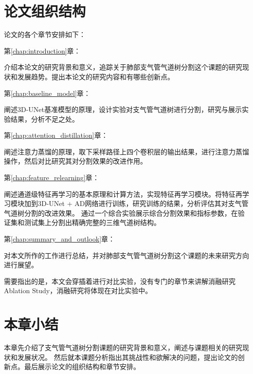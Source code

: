 \section{论文组织结构}

论文的各个章节安排如下：

{\kaishu 第\ref{chap:introduction}章：}

介绍本论文的研究背景和意义，追踪关于肺部支气管气道树分割这个课题的研究现状和发展趋势。提出本论文的研究内容和有哪些创新点。

{\kaishu 第\ref{chap:baseline_model}章：}

阐述3D-UNet基准模型的原理，设计实验对支气管气道树进行分割，研究与展示实验结果，分析不足之处。

{\kaishu 第\ref{chap:attention_distillation}章：}

阐述注意力蒸馏的原理，取下采样路径上四个卷积层的输出结果，进行注意力蒸馏操作，然后对比研究其对分割效果的改进作用。

{\kaishu 第\ref{chap:feature_relearning}章：}

阐述通道级特征再学习的基本原理和计算方法，实现特征再学习模块。将特征再学习模块加到3D-UNet + AD网络进行训练，研究训练的结果，分析评估其对支气管气道树分割的改进效果。
通过一个综合实验展示综合分割效果和指标参数，在验证集和测试集上分割出精确完整的三维气道树结构。

{\kaishu 第\ref{chap:summary_and_outlook}章：}

对本文所作的工作进行总结，并对肺部支气管气道树分割这个课题的未来研究方向进行展望。

需要指出的是，本文会穿插着进行对比实验，没有专门的章节来讲解消融研究Ablation Study，消融研究将体现在对比实验中。

\section{本章小结}

本章先介绍了支气管气道树分割课题的研究背景和意义，阐述与课题相关的研究现状和发展状况。 然后就本课题分析指出其挑战性和欲解决的问题，提出论文的创新点。最后展示论文的组织结构和章节安排。


